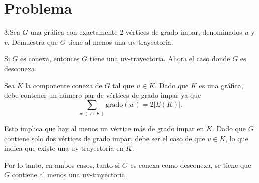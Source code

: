 \documentclass{article}
\begin{document}
\section*{Problema}
3.Sea \( G \) una gráfica con exactamente 2 vértices de grado impar, denominados \( u \) y \( v \). Demuestra que \( G \) tiene al menos una uv-trayectoria.

\begin{Dem.}
Si \( G \) es conexa, entonces \( G \) tiene una uv-trayectoria. Ahora el caso donde \( G \) es desconexa.

Sea \( K \) la componente conexa de \( G \) tal que \( u \in K \). Dado que \( K \) es una gráfica, debe contener un número par de vértices de grado impar ya que
\begin{equation}
\sum_{w \in V(K)} \text{grado}(w) = 2|E(K)|.
\end{equation}

Esto implica que hay al menos un vértice más de grado impar en \( K \). Dado que \( G \) contiene solo dos vértices de grado impar, debe ser el caso de que \( v \in K \), lo que indica que existe una uv-trayectoria en \( K \).

Por lo tanto, en ambos casos, tanto si \( G \) es conexa como desconexa, se tiene que \( G \) contiene al menos una uv-trayectoria.

\end{Dem.}
\end{document}

